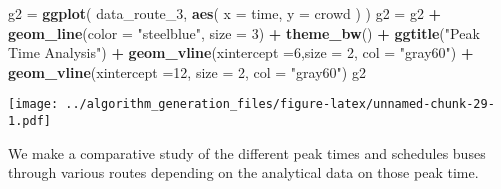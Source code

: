 \documentclass[
]{article}
\newenvironment{Shaded}{\begin{snugshade}}{\end{snugshade}}
\newcommand{\DataTypeTok}[1]{\textcolor[rgb]{0.13,0.29,0.53}{#1}}
\newcommand{\DecValTok}[1]{\textcolor[rgb]{0.00,0.00,0.81}{#1}}
\newcommand{\KeywordTok}[1]{\textcolor[rgb]{0.13,0.29,0.53}{\textbf{#1}}}
\newcommand{\NormalTok}[1]{#1}
\newcommand{\OperatorTok}[1]{\textcolor[rgb]{0.81,0.36,0.00}{\textbf{#1}}}
\newcommand{\StringTok}[1]{\textcolor[rgb]{0.31,0.60,0.02}{#1}}
\begin{document}
\begin{Shaded}
\begin{Highlighting}[]
\NormalTok{g2 =}\StringTok{ }\KeywordTok{ggplot}\NormalTok{(}
\NormalTok{  data_route_}\DecValTok{3}\NormalTok{,}
      \KeywordTok{aes}\NormalTok{(}
        \DataTypeTok{x =}\NormalTok{ time,}
        \DataTypeTok{y =}\NormalTok{ crowd}
\NormalTok{      )}
\NormalTok{) }
\NormalTok{g2 =}\StringTok{ }\NormalTok{g2 }\OperatorTok{+}\StringTok{ }\KeywordTok{geom_line}\NormalTok{(}\DataTypeTok{color =} \StringTok{"steelblue"}\NormalTok{, }\DataTypeTok{size =} \DecValTok{3}\NormalTok{) }\OperatorTok{+}\StringTok{ }\KeywordTok{theme_bw}\NormalTok{() }\OperatorTok{+}\StringTok{ }\KeywordTok{ggtitle}\NormalTok{(}\StringTok{"Peak Time Analysis"}\NormalTok{) }\OperatorTok{+}\StringTok{ }\KeywordTok{geom_vline}\NormalTok{(}\DataTypeTok{xintercept =}\DecValTok{6}\NormalTok{,}\DataTypeTok{size =} \DecValTok{2}\NormalTok{, }\DataTypeTok{col =} \StringTok{"gray60"}\NormalTok{) }\OperatorTok{+}\StringTok{ }\KeywordTok{geom_vline}\NormalTok{(}\DataTypeTok{xintercept =}\DecValTok{12}\NormalTok{, }\DataTypeTok{size =} \DecValTok{2}\NormalTok{, }\DataTypeTok{col =} \StringTok{"gray60"}\NormalTok{) }
\NormalTok{g2}
\end{Highlighting}
\end{Shaded}

\texttt{[image: ../algorithm\_generation\_files/figure-latex/unnamed-chunk-29-1.pdf]}

We make a comparative study of the different peak times and schedules
buses through various routes depending on the analytical data on those
peak time.
\end{document}
